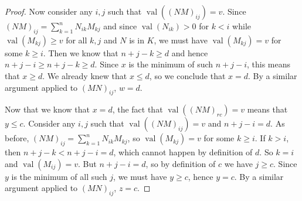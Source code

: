 \documentclass{amsart}
\theoremstyle{definition}
\def\val{\mathop{\mathrm{val}}}
\begin{document}
\begin{proof}
    Now consider any $i,j$ such that $\val((NM)_{ij}) = v$.  Since $(NM)_{ij} =
    \sum_{k=1}^n N_{ik}M_{kj}$ and since $\val(N_{ik}) > 0$ for $k < i$ while
    $\val(M_{kj}) \ge v$ for all $k,j$ and $N$ is in $K$, we must have
    $\val(M_{kj}) = v$ for some $k \ge i$.  Then we know that $n + j - k \ge d$
    and hence $n + j - i \ge n + j - k \ge d$.  Since $x$ is the minimum of
    such $n + j -i$, this means that $x \ge d$.  We already knew that
    $x \le d$, so we conclude that $x = d$.  By a similar argument applied to
    $(MN)_{ij}$, $w = d$.

    Now that we know that $x = d$, the fact that $\val((NM)_{rc}) = v$ means
    that $y \le c$.  Consider any $i,j$ such that $\val((NM)_{ij}) = v$ and $n
    + j - i = d$.  As before, $(NM)_{ij} = \sum_{k=1}^n N_{ik}M_{kj}$, so
    $\val(M_{kj}) = v$ for some $k \ge i$.  If $k > i$, then $n + j - k < n + j
    - i = d$, which cannot happen by definition of $d$.  So $k = i$ and
    $\val(M_{ij}) = v$.  But $n + j - i = d$, so by definition of $c$ we have
    $j \ge c$.  Since $y$ is the minimum of all such $j$, we must have $y \ge
    c$, hence $y = c$.  By a similar argument applied to $(MN)_{ij}$, $z = c$.
  \end{proof}
\end{document}

